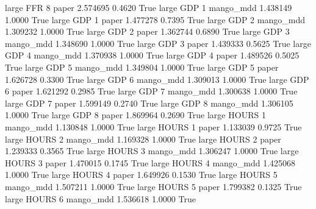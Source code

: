      large      FFR                 8                 paper      2.574695      0.4620    True
     large      GDP                 1             mango_mdd      1.438149      1.0000    True
     large      GDP                 1                 paper      1.477278      0.7395    True
     large      GDP                 2             mango_mdd      1.309232      1.0000    True
     large      GDP                 2                 paper      1.362744      0.6890    True
     large      GDP                 3             mango_mdd      1.348690      1.0000    True
     large      GDP                 3                 paper      1.439333      0.5625    True
     large      GDP                 4             mango_mdd      1.370938      1.0000    True
     large      GDP                 4                 paper      1.489526      0.5025    True
     large      GDP                 5             mango_mdd      1.349804      1.0000    True
     large      GDP                 5                 paper      1.626728      0.3300    True
     large      GDP                 6             mango_mdd      1.309013      1.0000    True
     large      GDP                 6                 paper      1.621292      0.2985    True
     large      GDP                 7             mango_mdd      1.300638      1.0000    True
     large      GDP                 7                 paper      1.599149      0.2740    True
     large      GDP                 8             mango_mdd      1.306105      1.0000    True
     large      GDP                 8                 paper      1.869964      0.2690    True
     large    HOURS                 1             mango_mdd      1.130848      1.0000    True
     large    HOURS                 1                 paper      1.133039      0.9725    True
     large    HOURS                 2             mango_mdd      1.169328      1.0000    True
     large    HOURS                 2                 paper      1.239333      0.3565    True
     large    HOURS                 3             mango_mdd      1.306247      1.0000    True
     large    HOURS                 3                 paper      1.470015      0.1745    True
     large    HOURS                 4             mango_mdd      1.425068      1.0000    True
     large    HOURS                 4                 paper      1.649926      0.1530    True
     large    HOURS                 5             mango_mdd      1.507211      1.0000    True
     large    HOURS                 5                 paper      1.799382      0.1325    True
     large    HOURS                 6             mango_mdd      1.536618      1.0000    True
